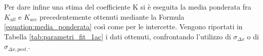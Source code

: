\documentclass[a4paper,11pt,oneside]{article}
\begin{document}
Per dare infine una stima del coefficiente K si è eseguita la media ponderata fra $K_{all}$ e $K_{acc}$ precedentemente ottenuti mediante la Formula \ref{equation:media_ponderata} così come per le intercette. Vengono riportati in Tabella \ref{tab:parametri_fit_1ac} i dati ottenuti, confrontando l'utilizzo di $\sigma_{\Delta x}$ o di $\sigma_{\Delta x, post.}$.

\begin{table}[h!]
    \centering
    \caption{Stime dei parametri del fit per il decimo estensimetro}
    \label{tab:parametri_fit_1ac}
\end{table}
\end{document}
